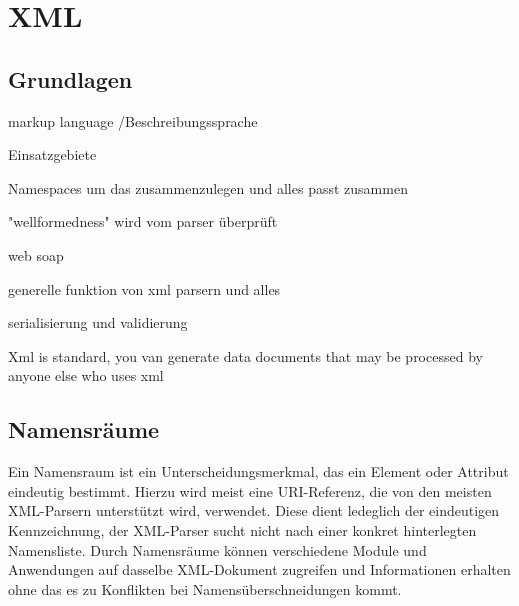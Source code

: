 \section{XML}

\subsection{Grundlagen}

markup language /Beschreibungssprache

Einsatzgebiete

Namespaces um das zusammenzulegen und alles passt zusammen

"wellformedness" wird vom parser überprüft

web soap

generelle funktion von xml parsern und alles

serialisierung und validierung


Xml is standard, you van generate data documents that may be processed by anyone else who uses xml 

\subsection{Namensräume}

Ein Namensraum ist ein Unterscheidungsmerkmal, das ein Element oder Attribut eindeutig bestimmt. Hierzu wird meist eine URI-Referenz, die von den meisten XML-Parsern unterstützt wird, verwendet. Diese dient ledeglich der eindeutigen Kennzeichnung, der XML-Parser sucht nicht nach einer konkret hinterlegten Namensliste. Durch Namensräume können verschiedene Module und Anwendungen auf dasselbe XML-Dokument zugreifen und Informationen erhalten ohne das es zu Konflikten bei Namensüberschneidungen kommt. 





